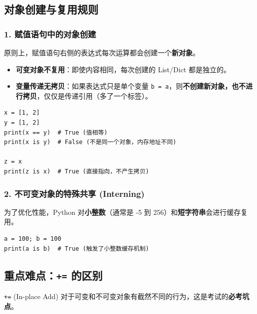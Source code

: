 \documentclass[12pt, a4paper]{article}
\begin{document}
\newpage

\subsection{对象创建与复用规则}

\subsubsection{1. 赋值语句中的对象创建}
原则上，赋值语句右侧的表达式每次运算都会创建一个\textbf{新对象}。
\begin{itemize}
    \item \textbf{可变对象不复用}：即使内容相同，每次创建的 List/Dict 都是独立的。
    \item \textbf{变量传递无拷贝}：如果表达式只是单个变量 \texttt{b = a}，则\textbf{不创建新对象，也不进行拷贝}，仅仅是传递引用（多了一个标签）。
\end{itemize}

\begin{lstlisting}
x = [1, 2]
y = [1, 2]
print(x == y)  # True (值相等)
print(x is y)  # False (不是同一个对象，内存地址不同)

z = x
print(z is x)  # True (直接指向，不产生拷贝)
\end{lstlisting}

\subsubsection{2. 不可变对象的特殊共享 (Interning)}
为了优化性能，Python 对\textbf{小整数}（通常是 -5 到 256）和\textbf{短字符串}会进行缓存复用。
\begin{lstlisting}
a = 100; b = 100
print(a is b)  # True (触发了小整数缓存机制)
\end{lstlisting}

\newpage

\subsection{重点难点：\texttt{+=} 的区别}

\texttt{+=} (In-place Add) 对于可变和不可变对象有截然不同的行为，这是考试的\textbf{必考坑点}。
\end{document}
